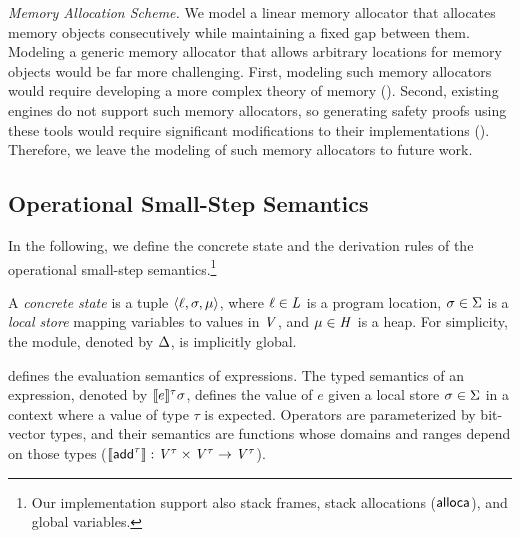 \textit{Memory Allocation Scheme.}
We model a linear memory allocator that allocates memory objects consecutively while maintaining a fixed gap between them.
Modeling a generic memory allocator that allows arbitrary locations for memory objects would be far more challenging.
First, modeling such memory allocators would require developing a more complex theory of memory ().
Second, existing \SE engines do not support such memory allocators,
so generating safety proofs using these tools would require significant modifications to their implementations ().
Therefore, we leave the modeling of such memory allocators to future work.

\subsection{Operational Small-Step Semantics}

In the following,
we define the concrete state and the derivation rules of the operational small-step semantics.\footnote{
Our implementation support also stack frames, stack allocations (\ie $\textsf{alloca}$), and global variables.
}

\begin{definition}
\label{def:state}
A \emph{concrete state} is a tuple $\langle{\ell},{\sigma},{\mathit{\mu}}\rangle$,
where $\ell \in \mathit{L}$ is a program location,
$\sigma \in \Sigma$ is a \emph{local store} mapping variables to values in $\mathit{V}$,
and $\mathit{\mu} \in \mathit{H}$ is a heap.
For simplicity, the \llvm module, denoted by $\Delta$, is implicitly global.
\end{definition}



 defines the evaluation semantics of \llvm expressions.
The typed semantics of an expression, denoted by $\llbracket e \rrbracket^{\tau}{\sigma}$,
defines the value of $e$ given a local store $\sigma \in \Sigma$ in a context where a value of type $\tau$ is expected.
Operators are parameterized by bit-vector types,
and their semantics are functions whose domains and ranges depend on those types (\eg $\llbracket \textsf{add}^\tau \rrbracket : \mathit{V}^\tau\times\mathit{V}^\tau\to\mathit{V}^\tau$).

